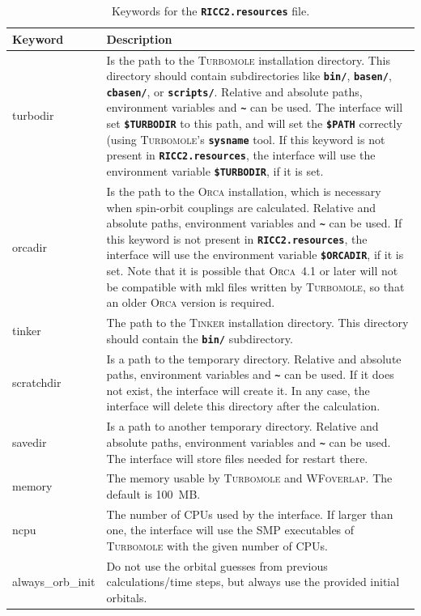 \documentclass[a4paper,10pt,DIV=15,openany]{scrbook}
\newcommand{\ttt}[1]{\textbf{\texttt{#1}}}
\begin{document}
\begin{table}
  \centering
  \caption{Keywords for the \ttt{RICC2.resources} file.}
  \label{tab:ricc2_sh2}
  \begin{tabular}{>{\ttfamily}lp{12cm}}
  \hline
  Keyword       &Description\\
  \hline
turbodir        &Is the path to the \textsc{Turbomole} installation directory. This directory should contain subdirectories like \ttt{bin/}, \ttt{basen/}, \ttt{cbasen/}, or \ttt{scripts/}. Relative and absolute paths, environment variables and \ttt{\textasciitilde} can be used. The interface will set \ttt{\$TURBODIR} to this path, and will set the \ttt{\$PATH} correctly (using \textsc{Turbomole}'s \ttt{sysname} tool. If this keyword is not present in \ttt{RICC2.resources}, the interface will use the environment variable \ttt{\$TURBODIR}, if it is set.\\
orcadir         &Is the path to the \textsc{Orca} installation, which is necessary when spin-orbit couplings are calculated. Relative and absolute paths, environment variables and \ttt{\textasciitilde} can be used. If this keyword is not present in \ttt{RICC2.resources}, the interface will use the environment variable \ttt{\$ORCADIR}, if it is set. Note that it is possible that \textsc{Orca}~4.1 or later will not be compatible with mkl files written by \textsc{Turbomole}, so that an older \textsc{Orca} version is required.\\
tinker                  &The path to the \textsc{Tinker} installation directory. This directory should contain the \ttt{bin/} subdirectory.\\
scratchdir      &Is a path to the temporary directory. Relative and absolute paths, environment variables and \ttt{\textasciitilde} can be used. If it does not exist, the interface will create it. In any case, the interface will delete this directory after the calculation.\\
savedir         &Is a path to another temporary directory.  Relative and absolute paths, environment variables and \ttt{\textasciitilde} can be used. The interface will store files needed for restart there.\\
memory          &The memory usable by \textsc{Turbomole} and \textsc{WFoverlap}. The default is 100~MB.\\
ncpu            & The number of CPUs used by the interface. If larger than one, the interface will use the SMP executables of \textsc{Turbomole} with the given number of CPUs.\\
always\_orb\_init &Do not use the orbital guesses from previous calculations/time steps, but always use the provided initial orbitals.\\

\end{tabular}
\end{table}
\end{document}
